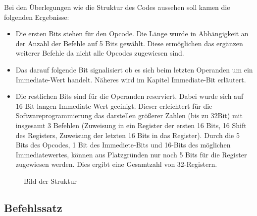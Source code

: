 \documentclass[paper=a4,fontsize=12pt,twocolumn]{scrreprt}
\begin{document}
Bei den Überlegungen wie die Struktur des Codes aussehen soll kamen die folgenden Ergebnisse: 
\begin{itemize}
    \item Die ersten Bits stehen für den Opcode. Die Länge wurde in Abhängigkeit an der Anzahl der Befehle auf 5 Bits gewählt. Diese ermöglichen das ergänzen weiterer Befehle da nicht alle Opcodes zugewiesen sind. 
    \item Das darauf folgende Bit signalisiert ob es sich beim letzten Operanden um ein Immediate-Wert handelt. Näheres wird im Kapitel Immediate-Bit erläutert.
    \item Die restlichen Bits sind für die Operanden reserviert. Dabei wurde sich auf 16-Bit langen Immediate-Wert geeinigt. Dieser erleichtert für die Softwareprogrammierung das darstellen größerer Zahlen (bis zu 32Bit) mit insgesamt 3 Befehlen (Zuweisung in ein Register der ersten 16 Bits, 16 Shift des Registers, Zuweisung der letzten 16 Bits in das Register). 
    Durch die 5 Bits des Opcodes, 1 Bit des Immediete-Bits und 16-Bits des möglichen Immediatewertes, können aus Platzgründen nur noch 5 Bits für die Register zugewiesen werden. Dies ergibt eine Gesamtzahl von 32-Registern. 
    
\end{itemize}

\begin{figure}[h]
\centering
\caption{Bild der Struktur}
\end{figure}

\subsection{Befehlssatz}
\end{document}
